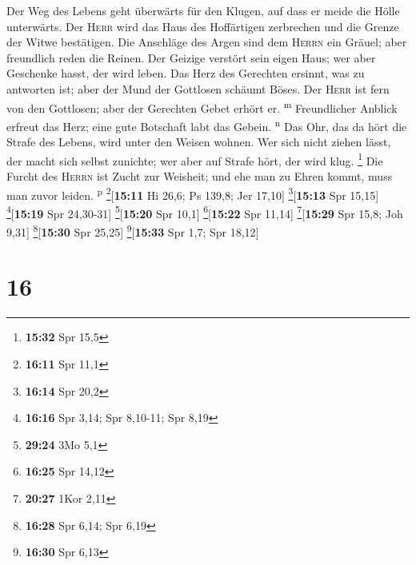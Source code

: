  Der Weg des Lebens geht überwärts für den Klugen, auf
dass er meide die Hölle unterwärts.  Der \textsc{Herr}
wird das Haus des Hoffärtigen zerbrechen und die Grenze der Witwe
bestätigen.  Die Anschläge des Argen sind dem
\textsc{Herrn} ein Gräuel; aber freundlich reden die Reinen.
 Der Geizige verstört sein eigen Haus; wer aber Geschenke
hasst, der wird leben.  Das Herz des Gerechten ersinnt,
was zu antworten ist; aber der Mund der Gottlosen schäumt Böses.
 Der \textsc{Herr} ist fern von den Gottlosen; aber der
Gerechten Gebet erhört er. \textsuperscript{m} 
Freundlicher Anblick erfreut das Herz; eine gute Botschaft labt das
Gebein. \textsuperscript{n}  Das Ohr, das da hört die
Strafe des Lebens, wird unter den Weisen wohnen.  Wer
sich nicht ziehen lässt, der macht sich selbst zunichte; wer aber auf
Strafe hört, der wird klug. \footnote{\textbf{15:32} Spr 15,5}
 Die Furcht des \textsc{Herrn} ist Zucht zur Weisheit;
und ehe man zu Ehren kommt, muss man zuvor leiden. \textsuperscript{p}
\footnote{\textbf{16:11} Spr 11,1}{[}\textbf{15:11} Hi 26,6; Ps 139,8;
Jer 17,10{]} \footnote{\textbf{16:14} Spr 20,2}{[}\textbf{15:13} Spr
15,15{]} \footnote{\textbf{16:16} Spr 3,14; Spr 8,10-11; Spr 8,19}{[}\textbf{15:19}
Spr 24,30-31{]} \footnote{\textbf{29:24} 3Mo 5,1}{[}\textbf{15:20} Spr
10,1{]} \footnote{\textbf{16:25} Spr 14,12}{[}\textbf{15:22} Spr
11,14{]} \footnote{\textbf{20:27} 1Kor 2,11}{[}\textbf{15:29} Spr 15,8;
Joh 9,31{]} \footnote{\textbf{16:28} Spr 6,14; Spr 6,19}{[}\textbf{15:30}
Spr 25,25{]} \footnote{\textbf{16:30} Spr 6,13}{[}\textbf{15:33} Spr
1,7; Spr 18,12{]}

\hypertarget{section-15}{%
\section{16}\label{section-15}}

